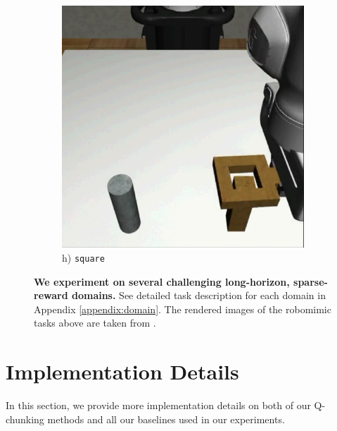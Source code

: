 \begin{figure}[t]
\begin{minipage}{0.24\textwidth}
\begin{subfigure}{\textwidth}
            \includegraphics[width=\linewidth]{figures/renders/square.jpeg}
            \caption{\footnotesize h) \texttt{square}}
        \end{subfigure}
    \end{minipage}\hfill
    \caption{\footnotesize \textbf{We experiment on several challenging long-horizon, sparse-reward domains.} See detailed task description for each domain in Appendix \ref{appendix:domain}. The rendered images of the robomimic tasks above are taken from \citet{robomimic2021}.}
    \label{fig:env_renders}
\end{figure}




\section{Implementation Details}
\label{appendix:impl-details}
In this section, we provide more implementation details on both of our Q-chunking methods and all our baselines used in our experiments. 





